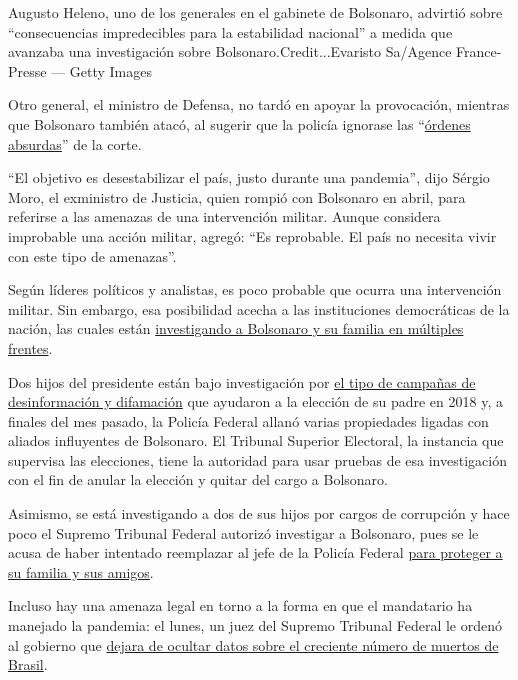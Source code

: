 Augusto Heleno, uno de los generales en el gabinete de Bolsonaro,
advirtió sobre ``consecuencias impredecibles para la estabilidad
nacional'' a medida que avanzaba una investigación sobre
Bolsonaro.Credit...Evaristo Sa/Agence France-Presse --- Getty Images

Otro general, el ministro de Defensa, no tardó en apoyar la provocación,
mientras que Bolsonaro también atacó, al sugerir que la policía ignorase
las
``\href{https://www.nytimes3xbfgragh.onion/2020/05/29/world/americas/brazil-bolsonaro-supreme-court.html}{órdenes
absurdas}'' de la corte.

``El objetivo es desestabilizar el país, justo durante una pandemia'',
dijo Sérgio Moro, el exministro de Justicia, quien rompió con Bolsonaro
en abril, para referirse a las amenazas de una intervención militar.
Aunque considera improbable una acción militar, agregó: ``Es reprobable.
El país no necesita vivir con este tipo de amenazas''.

Según líderes políticos y analistas, es poco probable que ocurra una
intervención militar. Sin embargo, esa posibilidad acecha a las
instituciones democráticas de la nación, las cuales están
\href{https://www.nytimes3xbfgragh.onion/2020/05/01/world/americas/brazil-bolsonaro-coronavirus-crisis.html}{investigando
a Bolsonaro y su familia en múltiples frentes}.

Dos hijos del presidente están bajo investigación por
\href{https://www.nytimes3xbfgragh.onion/2020/05/29/world/americas/brazil-bolsonaro-supreme-court.html}{el
tipo de campañas de desinformación y difamación} que ayudaron a la
elección de su padre en 2018 y, a finales del mes pasado, la Policía
Federal allanó varias propiedades ligadas con aliados influyentes de
Bolsonaro. El Tribunal Superior Electoral, la instancia que supervisa
las elecciones, tiene la autoridad para usar pruebas de esa
investigación con el fin de anular la elección y quitar del cargo a
Bolsonaro.

Asimismo, se está investigando a dos de sus hijos por cargos de
corrupción y hace poco el Supremo Tribunal Federal autorizó investigar a
Bolsonaro, pues se le acusa de haber intentado reemplazar al jefe de la
Policía Federal
\href{https://www.nytimes3xbfgragh.onion/2020/04/24/world/americas/brazil-bolsonaro-moro.html}{para
proteger a su familia y sus amigos}.

Incluso hay una amenaza legal en torno a la forma en que el mandatario
ha manejado la pandemia: el lunes, un juez del Supremo Tribunal Federal
le ordenó al gobierno que
\href{https://www.nytimes3xbfgragh.onion/es/2020/06/08/espanol/america-latina/brasil-cifras-coronavirus.html}{dejara
de ocultar datos sobre el creciente número de muertos de Brasil}.

